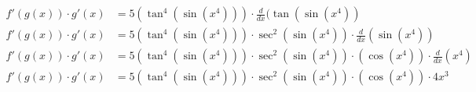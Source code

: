 \documentclass[preview]{standalone}
\begin{document}
\begin{align*}
f'(g(x)) \cdot g'(x)&=5(\tan^4(\sin(x^4))) \cdot \frac{d}{dx}(\tan(\sin(x^4)) \\ f'(g(x))\cdot g'(x)&=5(\tan^4(\sin(x^4))) \cdot \sec^2(\sin(x^4)) \cdot \frac{d}{dx}(\sin(x^4)) \\ f'(g(x))\cdot g'(x)&=5(\tan^4(\sin(x^4))) \cdot \sec^2(\sin(x^4)) \cdot (\cos(x^4)) \cdot \frac{d}{dx}(x^4) \\ f'(g(x))\cdot g'(x)&=5(\tan^4(\sin(x^4))) \cdot \sec^2(\sin(x^4)) \cdot (\cos(x^4)) \cdot 4x^3 \\
\end{align*}
\end{document}
